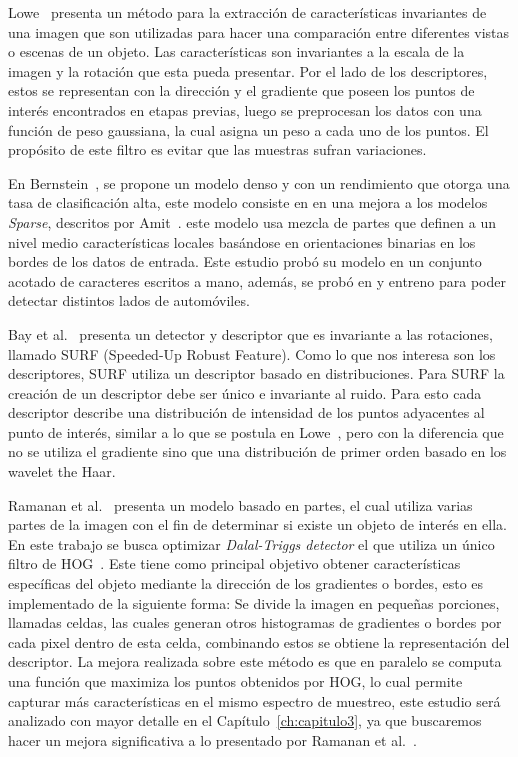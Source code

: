 Lowe~\cite{sift2004} presenta un método para la extracción de características invariantes de una imagen que son utilizadas para hacer una comparación entre diferentes vistas o escenas de un objeto. Las características son invariantes a la escala de la imagen y la rotación que esta pueda presentar. Por el lado de los descriptores, estos se representan con la dirección y el gradiente que poseen los puntos de interés encontrados en etapas previas, luego se preprocesan los datos con una función de peso gaussiana, la cual asigna un peso a cada uno de los puntos. El propósito de este filtro es evitar que las muestras sufran variaciones.

En Bernstein~\cite{statistical2005}, se propone un modelo denso y con un rendimiento que otorga una tasa de clasificación alta, este modelo consiste en en una mejora a los modelos \textit{Sparse}, descritos por Amit~\cite{2dobject2002}. este modelo usa mezcla de partes que definen a un nivel medio características locales basándose en orientaciones binarias en los bordes de los datos de entrada. Este estudio probó su modelo en un conjunto acotado de caracteres escritos a mano, además, se probó en y entreno para poder detectar distintos lados de automóviles.

Bay et al.~\cite{surf2008} presenta un detector y descriptor que es invariante a las rotaciones, llamado SURF (Speeded-Up Robust Feature). Como lo que nos interesa son los descriptores, SURF utiliza un descriptor basado en distribuciones. Para SURF la creación de un descriptor debe ser único e invariante al ruido. Para esto cada descriptor describe una distribución de intensidad de los puntos adyacentes al punto de interés, similar a lo que se postula en Lowe~\cite{sift2004}, pero con la diferencia que no se utiliza el gradiente sino que una distribución de primer orden basado en los wavelet the Haar.

Ramanan et al.~\cite{Felzenszwalb2010} presenta un modelo basado en partes,  el cual utiliza varias partes de la imagen con el fin de determinar si existe un objeto de interés en ella. En este trabajo se busca optimizar \textit{Dalal-Triggs detector} el que utiliza un único filtro de HOG~\cite{hog2005}. Este tiene como principal objetivo obtener características específicas del objeto mediante la dirección de los gradientes o bordes, esto es implementado de la siguiente forma: Se divide la imagen en pequeñas porciones, llamadas celdas, las cuales generan otros histogramas de gradientes o bordes por cada pixel dentro de esta celda, combinando estos se obtiene la representación del descriptor. La mejora realizada sobre este método es que en paralelo se computa una función que maximiza los puntos obtenidos por HOG, lo cual permite capturar más características en el mismo espectro de muestreo, este estudio será analizado con mayor detalle en el Capítulo~\ref{ch:capitulo3}, ya que buscaremos hacer un mejora significativa a lo presentado por Ramanan et al.~\cite{Felzenszwalb2010}.

